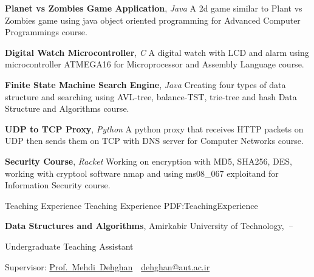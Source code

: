 \documentclass[letterpaper,MMMyyyy,nonstopmode]{resume}
\begin{document}
\begin{Body}
\BigGap
\BulletItem
\textbf{Planet vs Zombies Game Application},
\textit{\small{Java}}
\hfill
{\normalsize{
\href{https://github.com/aliyazdi75/Planet\_vs\_Zombies}
{\faGithub}
}}
\Item
A 2d game similar to Plant vs Zombies game using java
object oriented programming for Advanced Computer Programmings course.

\BigGap
\BulletItem
\textbf{Digital Watch Microcontroller},
\textit{\small{C}}
\hfill
{\normalsize{
\href{https://github.com/aliyazdi75/Digital-Watch-with-LCD}
{\faGithub}
}}
\Item
A digital watch with LCD and alarm using microcontroller
ATMEGA16 for Microprocessor and Assembly Language course.



\BigGap
\BulletItem
\textbf{Finite State Machine Search Engine},
\textit{\small{Java}}
\hfill
{\normalsize{
\href{https://github.com/aliyazdi75/Finite-State-Machine}
{\faGithub}
}}
\Item
Creating four types of data structure and searching using
AVL-tree, balance-TST, trie-tree and hash Data Structure and Algorithms course.

\BigGap
\BulletItem
\textbf{UDP to TCP Proxy},
\textit{\small{Python}}
\hfill
{\normalsize{
\href{https://github.com/aliyazdi75/DNS-UDP-TCP-Proxy}
{\faGithub}
}}
\Item
A python proxy that receives HTTP packets on UDP
then sends them on TCP with DNS server for Computer Networks course.

\BigGap
\BulletItem
\textbf{Security Course},
\textit{\small{Racket}}
\hfill
{\normalsize{
\href{https://github.com/aliyazdi75/My-Security-Course}
{\faGithub}
}}
\Item
Working on encryption with MD5, SHA256, DES,
working with cryptool software nmap
and using ms08\_067 exploitand for Information Security course.



\newpage


\Section
{Teaching Experience}
{Teaching Experience}
{PDF:TeachingExperience}

\Entry
\textbf{Data Structures and Algorithms},
Amirkabir University of Technology,
\hfill
\textsl{\small{\,--\,}}

\Gap
\BulletItem
Undergraduate Teaching Assistant
\begin{Detail}
\SubBulletItem
Supervisor:
\href{https://aut.ac.ir/cv/2123/Mehdi-Dehghan-Takht-Fooladi?slc_lang=en&&cv=2123&mod=scv}
{Prof.~Mehdi~Dehghan}
\,\SubBulletSymbol\,
\href{mailto:dehghan@aut.ac.ir}
{dehghan@aut.ac.ir}
\end{Detail}


\end{Body}
\end{document}
